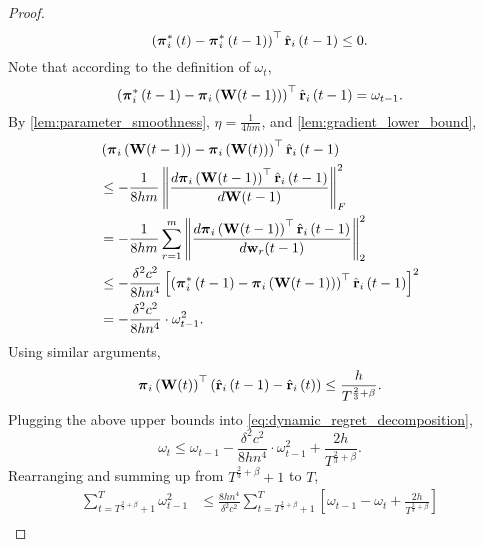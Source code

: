 \begin{proof}
\begin{equation*}
    \left( {{\boldsymbol{\pi}}_i^*\left(t\right)} - {{\boldsymbol{\pi}}_i^*\left(t-1\right)} \right)^\top \hat{{\mathbf{r}}}_i\left(t-1\right) \le 0.
\end{equation*}
Note that according to the definition of $\omega_t$,
\begin{equation*}
    \left( {{\boldsymbol{\pi}}_i^*\left(t-1\right)} - {\boldsymbol{\pi}}_i\left( {\mathbf{W}}(t-1) \right) \right)^\top \hat{{\mathbf{r}}}_i\left(t-1\right) = \omega_{t-1}.
\end{equation*}
By \cref{lem:parameter_smoothness}, $\eta = \frac{1}{4hm}$, and \cref{lem:gradient_lower_bound},
\begin{equation*}
\begin{split}
    &\left(  {\boldsymbol{\pi}}_i\left( {\mathbf{W}}(t-1) \right) - {\boldsymbol{\pi}}_i\left( {\mathbf{W}}(t) \right) 
    \right)^\top \hat{{\mathbf{r}}}_i\left(t-1\right) \\
    &\le - \frac{1}{8 h m} \left\| \frac{d {\boldsymbol{\pi}}_i\left( {\mathbf{W}}(t-1) \right)^\top \hat{{\mathbf{r}}}_i\left(t-1\right)}{d {\mathbf{W}}(t-1)} \right\|_F^2 \\
    &= - \frac{1}{8 h m} \sum\limits_{r=1}^{m}{ \left\| \frac{d {\boldsymbol{\pi}}_i\left( {\mathbf{W}}(t-1) \right)^\top \hat{{\mathbf{r}}}_i\left(t-1\right)}{d {\mathbf{w}}_r(t-1)} \right\|_2^2 } \\
    &\le - \frac{\delta^2 c^2}{8 h n^4} \left[ \left( {{\boldsymbol{\pi}}_i^*\left(t-1\right)} - {\boldsymbol{\pi}}_i\left( {\mathbf{W}}(t-1) \right) \right)^\top \hat{{\mathbf{r}}}_i\left(t-1\right)  \right]^2 \\
    &= - \frac{\delta^2 c^2}{8 h n^4} \cdot \omega_{t-1}^2.
\end{split}
\end{equation*}
Using similar arguments,
\begin{equation*}
    {\boldsymbol{\pi}}_i\left( {\mathbf{W}}(t) \right)^\top \left( \hat{{\mathbf{r}}}_i\left(t-1\right) - \hat{{\mathbf{r}}}_i\left(t\right)  \right) \le \frac{h}{T^{\frac{2}{3} + \beta}}.
\end{equation*}
Plugging the above upper bounds into \cref{eq:dynamic_regret_decomposition},
\begin{equation*}
    \omega_t \le \omega_{t-1} - \frac{\delta^2 c^2}{8 h n^4} \cdot \omega_{t-1}^2 + \frac{2h}{T^{\frac{2}{3} + \beta}}.
\end{equation*}
Rearranging and summing up from $T^{\frac{2}{3} + \beta} + 1$ to $T$,
\begin{equation*}
\begin{split}
    \sum\limits_{t=T^{\frac{2}{3}+ \beta}+1}^{T}{\omega_{t-1}^2} &\le \frac{8 h n^4}{\delta^2 c^2} \sum\limits_{t=T^{\frac{2}{3}+ \beta}+1}^{T} { \left[ \omega_{t-1} - \omega_t + \frac{2h}{T^{\frac{2}{3} + \beta}} \right] } \\

\end{split}
\end{equation*}
\end{proof}
